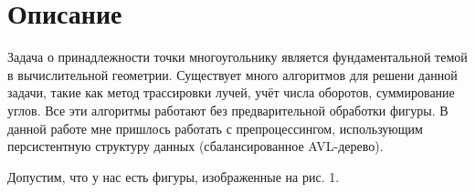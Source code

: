 \section{Описание}

Задача о принадлежности точки многоугольнику является фундаментальной темой в вычислительной геометрии. Существует много алгоритмов для решени данной задачи, такие как метод трассировки лучей, учёт числа оборотов, суммирование углов. Все эти алгоритмы работают без предварительной обработки фигуры. В данной работе мне пришлось работать с препроцессингом, использующим персистентную структуру данных (сбалансированное AVL-дерево). 

Допустим, что у нас есть фигуры, изображенные на рис. 1. 

\begin{figure}[h]
\end{figure}

